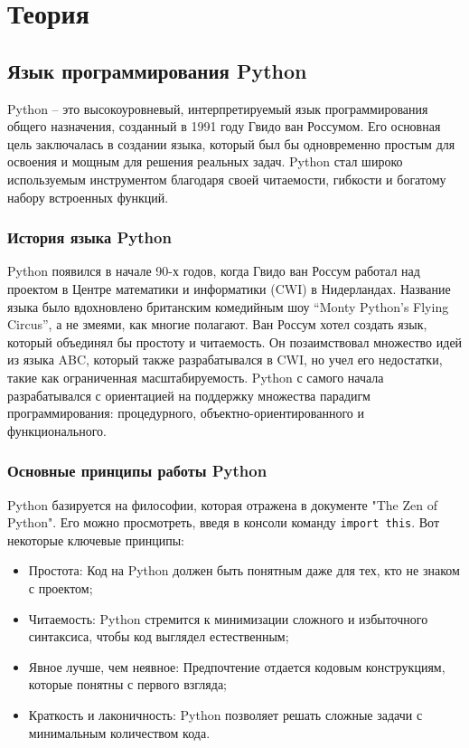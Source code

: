 \chapter{Теория}
\label{ch:theory}

\section{Язык программирования Python}

Python – это высокоуровневый, интерпретируемый язык программирования общего назначения, созданный в 1991 году Гвидо ван Россумом. Его основная цель заключалась в создании языка, который был бы одновременно простым для освоения и мощным для решения реальных задач. Python стал широко используемым инструментом благодаря своей читаемости, гибкости и богатому набору встроенных функций.

\subsection*{История языка Python}

Python появился в начале 90-х годов, когда Гвидо ван Россум работал над проектом в Центре математики и информатики (CWI) в Нидерландах. Название языка было вдохновлено британским комедийным шоу ``Monty Python’s Flying Circus'', а не змеями, как многие полагают. Ван Россум хотел создать язык, который объединял бы простоту и читаемость. Он позаимствовал множество идей из языка ABC, который также разрабатывался в CWI, но учел его недостатки, такие как ограниченная масштабируемость. Python с самого начала разрабатывался с ориентацией на поддержку множества парадигм программирования: процедурного, объектно-ориентированного и функционального.

\subsection*{Основные принципы работы Python}

Python базируется на философии, которая отражена в документе "The Zen of Python". Его можно просмотреть, введя в консоли команду \texttt{import this}. Вот некоторые ключевые принципы:

\begin{itemize}
    \item Простота: Код на Python должен быть понятным даже для тех, кто не знаком с проектом;
    \item Читаемость: Python стремится к минимизации сложного и избыточного синтаксиса, чтобы код выглядел естественным;
    \item Явное лучше, чем неявное: Предпочтение отдается кодовым конструкциям, которые понятны с первого взгляда;
    \item Краткость и лаконичность: Python позволяет решать сложные задачи с минимальным количеством кода.
\end{itemize}

